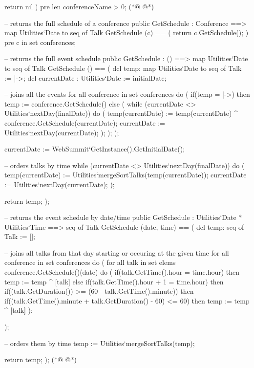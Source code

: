 \begin{vdmpp}[breaklines=true]
     return nil
    )
  pre len conferenceName > 0;
(*@
\label{GetSchedule:139}
@*)
  
  -- returns the full schedule of a conference
  public GetSchedule : Conference ==> map Utilities`Date to seq of Talk
    GetSchedule (c) == (
     return c.GetSchedule();
    )
    pre c in set conferences;
    
  -- returns the full event schedule
  public GetSchedule : () ==> map Utilities`Date to seq of Talk
    GetSchedule () == (
     dcl temp: map Utilities`Date to seq of Talk := {|->};
     dcl currentDate : Utilities`Date := initialDate;
     
     -- joins all the events
     for all conference in set conferences do (
      if(temp = {|->})
       then temp := conference.GetSchedule()
       else 
       (
        while (currentDate <> Utilities`nextDay(finalDate))
          do (
             temp(currentDate) := temp(currentDate) ^ conference.GetSchedule(currentDate);
            currentDate := Utilities`nextDay(currentDate);
            );
       );
     );
     
     currentDate := WebSummit`GetInstance().GetInitialDate();
     
     -- orders talks by time
     while (currentDate <> Utilities`nextDay(finalDate))
     do (
      temp(currentDate) := Utilities`mergeSortTalks(temp(currentDate));
      currentDate := Utilities`nextDay(currentDate);
    );
          
     return temp;
    );   
    
  -- returns the event schedule by date/time
  public GetSchedule : Utilities`Date * Utilities`Time ==> seq of Talk
    GetSchedule (date, time) == (
     dcl temp: seq of Talk := [];
     
     -- joins all talks from that day starting or occuring at the given time
     for all conference in set conferences do (
      for all talk in set elems conference.GetSchedule()(date) do
      (
       if(talk.GetTime().hour = time.hour)
       then temp := temp ^ [talk]
       else
        if(talk.GetTime().hour + 1 = time.hour)
        then if((talk.GetDuration()) >= (60 - talk.GetTime().minute))
         then if((talk.GetTime().minute + talk.GetDuration() - 60) <= 60)
          then temp := temp ^ [talk]
      );
      
     );
     
     -- orders them by time
    temp := Utilities`mergeSortTalks(temp);
          
     return temp;
    );   
(*@
\label{AddAttendee:204}
@*)
    

\end{vdmpp}
